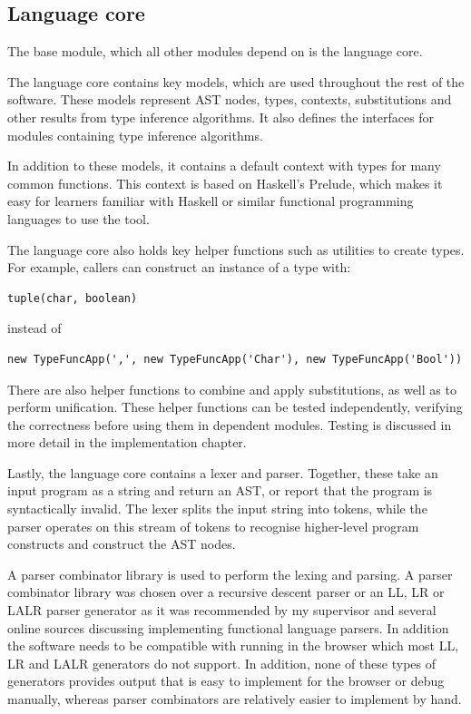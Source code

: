 \documentclass[a4paper,fleqn,oneside,12pt]{report}
\begin{document}
\subsection{Language core}\label{id:h.hggmfighusoc}

The base module, which all other modules depend on is the language core.

The language core contains key models, which are used throughout the rest of the software. These models represent AST nodes, types, contexts, substitutions and other results from type inference algorithms. It also defines the interfaces for modules containing type inference algorithms.

In addition to these models, it contains a default context with types for many common functions. This context is based on Haskell's Prelude, which makes it easy for learners familiar with Haskell or similar functional programming languages to use the tool.

The language core also holds key helper functions such as utilities to create types. For example, callers can construct an instance of a type with:

\begin{verbatim}
tuple(char, boolean)
\end{verbatim}
instead of

\begin{verbatim}
new TypeFuncApp(',', new TypeFuncApp('Char'), new TypeFuncApp('Bool'))
\end{verbatim}
There are also helper functions to combine and apply substitutions, as well as to perform unification. These helper functions can be tested independently, verifying the correctness before using them in dependent modules. Testing is discussed in more detail in the implementation chapter.

Lastly, the language core contains a lexer and parser. Together, these take an input program as a string and return an AST, or report that the program is syntactically invalid. The lexer splits the input string into tokens, while the parser operates on this stream of tokens to recognise higher-level program constructs and construct the AST nodes.

A parser combinator library is used to perform the lexing and parsing. A parser combinator library was chosen over a recursive descent parser or an LL, LR or LALR parser generator as it was recommended by my supervisor and several online sources discussing implementing functional language parsers. In addition the software needs to be compatible with running in the browser which most LL, LR and LALR generators do not support. In addition, none of these types of generators provides output that is easy to implement for the browser or debug manually, whereas parser combinators are relatively easier to implement by hand.
\end{document}
